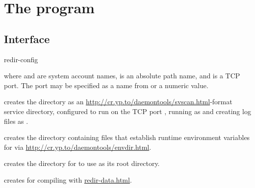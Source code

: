 
\chapter{The  program}

\section{Interface}
\begin{code}
  redir-config    
\end{code}
where  and  are system account names,
 is an absolute path name, and  is a TCP port.
The port may be specified as a name from  or a
numeric value.

 creates the directory  as an
\href{svscan}{http://cr.yp.to/daemontools/svscan.html}-format service
directory, configured to run  on the TCP port
, running  as  and creating log
files as .

 creates the directory 
containing files that establish runtime environment variables for
 via \href{envdir}{http://cr.yp.to/daemontools/envdir.html}.

 creates the directory  for
 to use as its root directory.

 creates  for compiling
 with \href{\cmd{redir-data}}{redir-data.html}.



